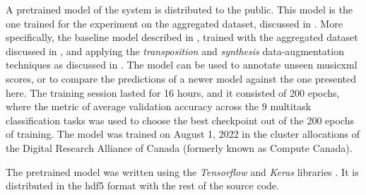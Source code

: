 
A pretrained model of the system is distributed to the
public. This model is the one trained for the experiment on
the aggregated dataset, discussed in
. More specifically,
the baseline model described in
, trained with the aggregated
dataset discussed in , and
applying the \emph{transposition} and \emph{synthesis}
data-augmentation techniques as discussed in
. The model can be used
to annotate unseen \gls{musicxml} scores, or to compare the
predictions of a newer model against the one presented here.
The training session lasted for 16 hours, and it consisted
of 200 epochs, where the metric of average validation
accuracy across the 9 multitask classification tasks was
used to choose the best checkpoint out of the 200 epochs of
training. The model was trained on August 1, 2022 in the
cluster allocations of the Digital Research Alliance of
Canada (formerly known as Compute Canada).

The pretrained model was written using the \emph{Tensorflow}
and \emph{Keras} libraries \parencite{abadi2016tensorflow,
chollet2021deep}. It is distributed in the \gls{hdf5} format
with the rest of the source
code. 
